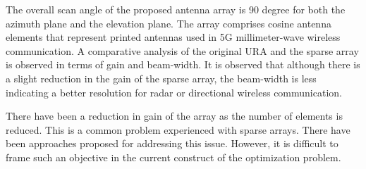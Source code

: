 The overall scan angle of the proposed antenna array is 90 degree for both the azimuth plane and the elevation plane. The array comprises cosine antenna elements that represent printed antennas used in 5G millimeter-wave wireless communication. A comparative analysis of the original URA and the sparse array is observed in terms of gain and beam-width. It is observed that although there is a slight reduction in the gain of the sparse array, the beam-width is less indicating a better resolution for radar or directional wireless communication.

There have been a reduction in gain of the array as the number of elements is reduced. This is a common problem experienced with sparse arrays. There have been approaches proposed for addressing this issue. However, it is difficult to frame such an objective in the current construct of the optimization problem.
